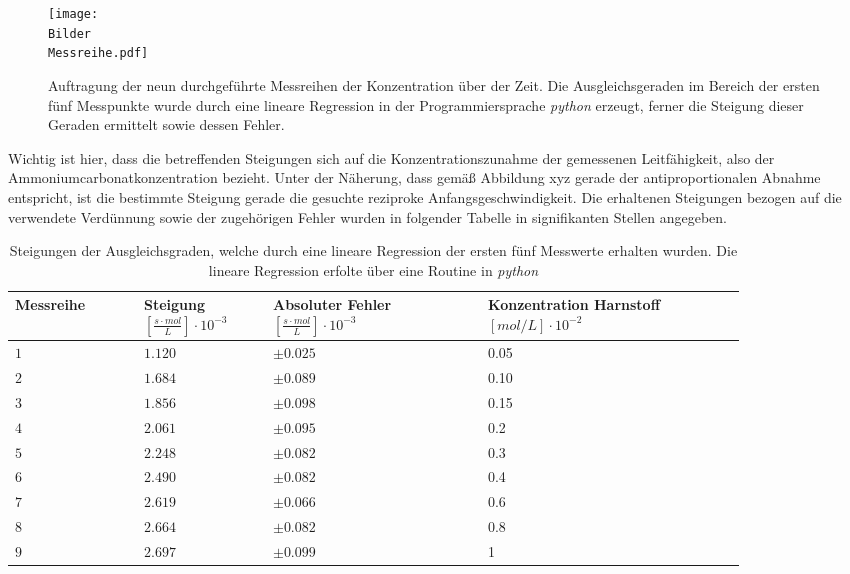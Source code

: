 \begin{figure}[H]
	\centering	
	\begin{minipage}{1\textwidth}
		\texttt{[image: \\Bilder\\Messreihe.pdf]}
	\end{minipage}
	\caption{Auftragung der neun durchgeführte Messreihen der Konzentration über der Zeit. Die Ausgleichsgeraden im Bereich der ersten fünf Messpunkte wurde durch eine lineare Regression in der Programmiersprache \textit{python} erzeugt, ferner die Steigung dieser Geraden ermittelt sowie dessen Fehler.}
	\label{Messreihe}
\end{figure}
Wichtig ist hier, dass die betreffenden Steigungen sich auf die Konzentrationszunahme der gemessenen Leitfähigkeit, also der Ammoniumcarbonatkonzentration bezieht. Unter der Näherung, dass gemäß Abbildung xyz gerade der antiproportionalen Abnahme entspricht, ist die bestimmte Steigung gerade die gesuchte reziproke Anfangsgeschwindigkeit. Die erhaltenen Steigungen bezogen auf die verwendete Verdünnung sowie der zugehörigen Fehler wurden in folgender Tabelle in signifikanten Stellen angegeben.
\begin{table}[H]
\centering
\label{Steigungstabelle}
	\caption{Steigungen der Ausgleichsgraden, welche durch eine lineare Regression der ersten fünf Messwerte erhalten wurden. Die lineare Regression erfolte über eine Routine in \textit{python}}
	\begin{tabular}{C{0.15\linewidth}|C{0.15\linewidth}C{0.25\linewidth}C{0.3\linewidth}}
		Messreihe  &  Steigung $\left[\si{\frac{s\cdot mol}{L}}\right] \cdot 10^{-3}$ &  Absoluter Fehler $\left[\si{\frac{s \cdot mol}{L}}\right] \cdot 10^{-3}$ & Konzentration Harnstoff $\left[\si{mol/L}\right]\cdot 10^{-2}$ \\
		\hline \addlinespace[1ex] 
		$ 1$ & $1.120$ & $\pm 0.025$ & 0.05\\
		$2$ & $1.684$& $ \pm 0.089$ &0.10\\
		$3$ & $1.856$& $\pm 0.098$ &0.15\\
		$4$ &$2.061$& $\pm 0.095$&0.2\\
		$5$&  $2.248$&  $\pm 0.082$ &0.3\\
		$6$&  $2.490$&  $\pm 0.082$&0.4\\
		$7$ &  $2.619$&$\pm 0.066$&0.6\\
		$8$ & $2.664$&$\pm  0.082$ &0.8\\
		$9$ &  $2.697$& $\pm 0.099$ &1\\
	\end{tabular}
\end{table}
